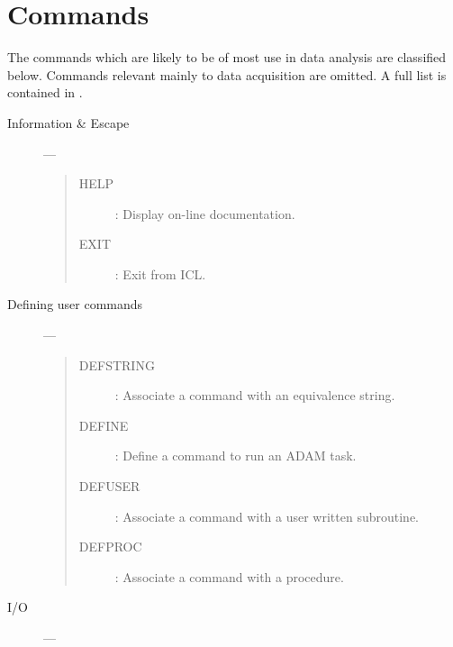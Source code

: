 \section{Commands}

The commands which are likely to be of most use in data analysis are classified
below.
Commands relevant mainly to data acquisition are omitted.
A full list is contained in .
\begin{description}

\item [Information \& Escape] ---

\begin{quote}
\begin{description}
\item[HELP] :
 Display on-line documentation.
\item[EXIT] :
 Exit from ICL.
\end{description}
\end{quote}

\item [Defining user commands] ---

\begin{quote}
\begin{description}
\item[DEFSTRING] :
 Associate a command with an equivalence string.
\item[DEFINE] :
 Define a command to run an ADAM task.
\item[DEFUSER] :
 Associate a command with a user written subroutine.
\item[DEFPROC] :
 Associate a command with a procedure.
\end{description}
\end{quote}

\item [I/O] ---


\end{description}
